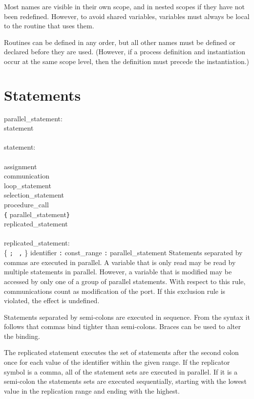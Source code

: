 Most names are visible in their own scope, and in nested scopes if they
have not been redefined. However, to avoid shared variables, variables
must always be local to the routine that uses them.

Routines can be defined in any order, but all other names must be
defined or declared before they are used. (However, if a process definition
and instantiation occur at the same scope level, then the definition must
precede the instantiation.)



\section{Statements}\label{sec:statements}

\grammarstart
parallel\_statement: \\
      \>statement\LIST \\
 \\
statement: \\
        \\
\orbox \>assignment \\
\orbox \>communication \\
\orbox \>loop\_statement \\
\orbox \>selection\_statement \\
\orbox \>procedure\_call \\
\orbox \>\verb|{| parallel\_statement\TSEQ \verb|}| \\
\orbox \>replicated\_statement \\
 \\
replicated\_statement: \\
      \>{\tt{}<<} \{ {\tt{};} \orbox \ {\tt{},} \} identifier {\tt{}:} const\_range {\tt{}:} parallel\_statement\TSEQ {\tt{}>>}
\grammarend
Statements separated by commas are executed in parallel. A variable
that is only read may be read by multiple statements in parallel.
However, a variable that is modified may be accessed by only one of
a group of parallel statements. With respect to this rule, communications
count as modification of the port. If this exclusion rule is violated,
the effect is undefined.

Statements separated by semi-colons are executed in sequence. From
the syntax it follows that commas bind tighter than semi-colons. Braces
can be used to alter the binding.

The replicated statement executes the set of statements after the second
colon once for each value of the identifier within the given range.  If
the replicator symbol is a comma, all of the statement sets are executed
in parallel.  If it is a semi-colon the statements sets are executed
sequentially, starting with the lowest value in the replication range
and ending with the highest.

